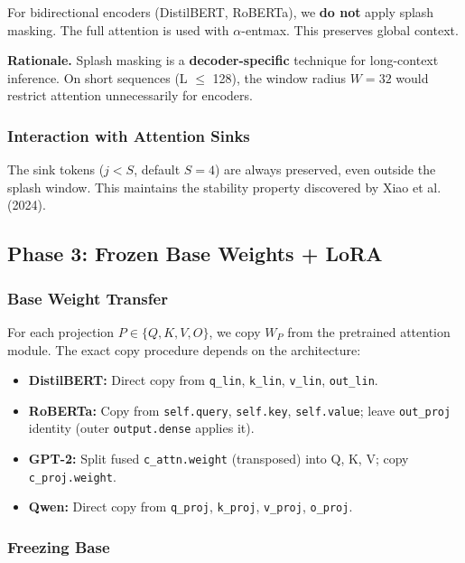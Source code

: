 For bidirectional encoders (DistilBERT, RoBERTa), we \textbf{do not} apply 
splash masking. The full attention is used with $\alpha$-entmax. This preserves 
global context.

\textbf{Rationale.} Splash masking is a \textbf{decoder-specific} technique for 
long-context inference. On short sequences (L $\le$ 128), the window radius 
$W = 32$ would restrict attention unnecessarily for encoders.

\subsubsection{Interaction with Attention Sinks}

The sink tokens ($j < S$, default $S = 4$) are always preserved, even outside 
the splash window. This maintains the stability property discovered by 
Xiao et al. (2024).

\subsection{Phase 3: Frozen Base Weights + LoRA}

\subsubsection{Base Weight Transfer}

For each projection $P \in \{Q, K, V, O\}$, we copy $W_P$ from the pretrained 
attention module. The exact copy procedure depends on the architecture:

\begin{itemize}
\item \textbf{DistilBERT:} Direct copy from \texttt{q\_lin}, \texttt{k\_lin}, \texttt{v\_lin}, \texttt{out\_lin}.
\item \textbf{RoBERTa:} Copy from \texttt{self.query}, \texttt{self.key}, \texttt{self.value}; leave
  \texttt{out\_proj} identity (outer \texttt{output.dense} applies it).
\item \textbf{GPT-2:} Split fused \texttt{c\_attn.weight} (transposed) into Q, K, V; copy
  \texttt{c\_proj.weight}.
\item \textbf{Qwen:} Direct copy from \texttt{q\_proj}, \texttt{k\_proj}, \texttt{v\_proj}, \texttt{o\_proj}.

\end{itemize}
\subsubsection{Freezing Base}

